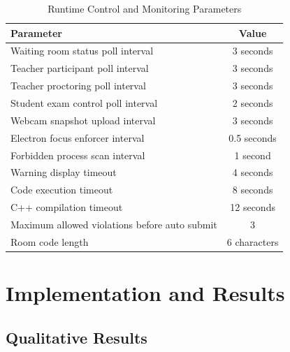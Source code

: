 \documentclass[12pt, a4paper]{report}
\begin{document}
\begin{table}[H]
  \caption{Runtime Control and Monitoring Parameters}
  \label{tab:4.1}
  \centering
  {\fontsize{11}{14}\selectfont
    \begin{tabular}{|p{2.6in}|c|}
      \hline
      \textbf{Parameter} & \textbf{Value} \\
      \hline
      Waiting room status poll interval & 3 seconds \\
      \hline
      Teacher participant poll interval & 3 seconds \\
      \hline
      Teacher proctoring poll interval & 3 seconds \\
      \hline
      Student exam control poll interval & 2 seconds \\
      \hline
      Webcam snapshot upload interval & 3 seconds \\
      \hline
      Electron focus enforcer interval & 0.5 seconds \\
      \hline
      Forbidden process scan interval & 1 second \\
      \hline
      Warning display timeout & 4 seconds \\
      \hline
      Code execution timeout & 8 seconds \\
      \hline
      C++ compilation timeout & 12 seconds \\
      \hline
      Maximum allowed violations before auto submit & 3 \\
      \hline
      Room code length & 6 characters \\
      \hline
    \end{tabular}
  }
\end{table}

\section{Implementation and Results}

\subsection{Qualitative Results}
\end{document}
